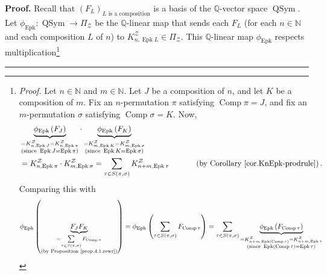\documentclass[numbers=enddot,12pt,final,onecolumn,notitlepage]{scrartcl}%
\theoremstyle{definition}
\newenvironment{proof}[1][Proof]{\noindent\textbf{#1.} }{\ \rule{0.5em}{0.5em}}
\let\sumnonlimits\sum
\renewcommand{\sum}{\sumnonlimits\limits}
\begin{document}
\begin{proof}
Recall that $\left(  F_{L}\right)  _{L\text{ is a composition}}$ is a basis of
the $\mathbb{Q}$-vector space $\operatorname*{QSym}$. Let $\phi
_{\operatorname*{Epk}}:\operatorname*{QSym}\rightarrow\Pi_{\mathcal{Z}}$ be
the $\mathbb{Q}$-linear map that sends each $F_{L}$ (for each $n\in\mathbb{N}$
and each composition $L$ of $n$) to $K_{n,\operatorname*{Epk}L}^{\mathcal{Z}%
}\in\Pi_{\mathcal{Z}}$. This $\mathbb{Q}$-linear map $\phi
_{\operatorname*{Epk}}$ respects multiplication\footnote{\textit{Proof.} Let
$n\in\mathbb{N}$ and $m\in\mathbb{N}$. Let $J$ be a composition of $n$, and
let $K$ be a composition of $m$. Fix an $n$-permutation $\pi$ satisfying
$\operatorname*{Comp}\pi=J$, and fix an $m$-permutation $\sigma$ satisfying
$\operatorname*{Comp}\sigma=K$. Now,%
\begin{align*}
&  \underbrace{\phi_{\operatorname*{Epk}}\left(  F_{J}\right)  }%
_{\substack{=K_{n,\operatorname*{Epk}J}^{\mathcal{Z}}=K_{n,\operatorname*{Epk}%
\pi}^{\mathcal{Z}}\\\text{(since }\operatorname*{Epk}J=\operatorname*{Epk}%
\pi\text{)}}}\cdot\underbrace{\phi_{\operatorname*{Epk}}\left(  F_{K}\right)
}_{\substack{=K_{m,\operatorname*{Epk}K}^{\mathcal{Z}}%
=K_{m,\operatorname*{Epk}\sigma}^{\mathcal{Z}}\\\text{(since }%
\operatorname*{Epk}K=\operatorname*{Epk}\sigma\text{)}}}\\
&  =K_{n,\operatorname*{Epk}\pi}^{\mathcal{Z}}\cdot K_{m,\operatorname*{Epk}%
\sigma}^{\mathcal{Z}}=\sum_{\tau\in S\left(  \pi,\sigma\right)  }%
K_{n+m,\operatorname*{Epk}\tau}^{\mathcal{Z}}\ \ \ \ \ \ \ \ \ \ \left(
\text{by Corollary \ref{cor.KnEpk-prodrule}}\right)  .
\end{align*}
Comparing this with%
\begin{align*}
\phi_{\operatorname*{Epk}}\left(  \underbrace{F_{J}F_{K}}_{\substack{=\sum
_{\tau\in S\left(  \pi,\sigma\right)  }F_{\operatorname*{Comp}\tau}\\\text{(by
Proposition~\ref{prop.4.1.rewr})}}}\right)   &  =\phi_{\operatorname*{Epk}%
}\left(  \sum_{\tau\in S\left(  \pi,\sigma\right)  }F_{\operatorname*{Comp}%
\tau}\right)  =\sum_{\tau\in S\left(  \pi,\sigma\right)  }\underbrace{\phi
_{\operatorname*{Epk}}\left(  F_{\operatorname*{Comp}\tau}\right)
}_{\substack{=K_{n+m,\operatorname*{Epk}\left(  \operatorname*{Comp}%
\tau\right)  }^{\mathcal{Z}}=K_{n+m,\operatorname*{Epk}\tau}^{\mathcal{Z}%
}\\\text{(since }\operatorname*{Epk}\left(  \operatorname*{Comp}\tau\right)
=\operatorname*{Epk}\tau\text{)}}}\\

\end{align*}}
\end{proof}
\end{document}
